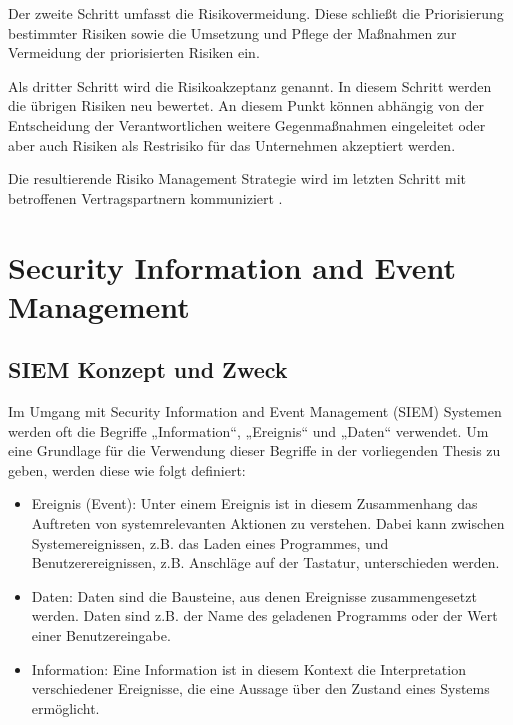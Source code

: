 Der zweite Schritt umfasst die Risikovermeidung. Diese schließt die Priorisierung bestimmter Risiken sowie die Umsetzung und Pflege der Maßnahmen zur Vermeidung der priorisierten Risiken ein. 

Als dritter Schritt wird die Risikoakzeptanz genannt. In diesem Schritt werden die übrigen Risiken neu bewertet. An diesem Punkt können abhängig von der Entscheidung der Verantwortlichen weitere Gegenmaßnahmen eingeleitet oder aber auch Risiken als Restrisiko für das Unternehmen akzeptiert werden. 

Die resultierende Risiko Management Strategie wird im letzten Schritt mit betroffenen Vertragspartnern kommuniziert \citep{Partida2010}.

\section{Security Information and Event Management}
\label{cha:Security Information and Event Management}

\subsection{SIEM Konzept und Zweck}
\label{cha::SIEM Konzept und Zweck}
Im Umgang mit Security Information and Event Management (SIEM) Systemen werden oft die Begriffe „Information“, „Ereignis“ und „Daten“ verwendet. Um eine Grundlage für die Verwendung dieser Begriffe in der vorliegenden Thesis zu geben, werden diese wie folgt definiert:
\begin{itemize}
\item Ereignis (Event): Unter einem Ereignis ist in diesem Zusammenhang das Auftreten von systemrelevanten Aktionen zu verstehen. Dabei kann zwischen Systemereignissen, z.B. das Laden eines Programmes, und Benutzerereignissen, z.B. Anschläge auf der Tastatur, unterschieden werden. 
\item Daten: Daten sind die Bausteine, aus denen Ereignisse zusammengesetzt werden. Daten sind z.B. der Name des geladenen Programms oder der Wert einer Benutzereingabe.
\item Information: Eine Information ist in diesem Kontext die Interpretation verschiedener Ereignisse, die eine Aussage über den Zustand eines Systems ermöglicht.
\end{itemize}


